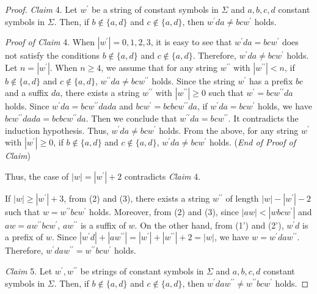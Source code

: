 \begin{proof}
  \smallskip

  \noindent
  \textit{Claim} 4.
  Let $w^{\prime}$ be a string of constant symbols in $\Sigma$ and $a,b,c,d$ constant symbols in $\Sigma$.
  Then, if $b \not\in \{a,d\}$ and $c \not\in \{a,d\}$, then $w^{\prime}da \not = bcw^{\prime}$ holds.

  \smallskip
  
  \noindent
  \textit{Proof of Claim} 4.
  When $|w^{\prime}| = 0, 1, 2, 3$, it is easy to see that $w^{\prime}da=bcw^{\prime}$ does not satisfy the conditions $b \not\in \{a,d\}$ and $c \not\in \{a,d\}$. Therefore, $w^{\prime}da \not= bcw^{\prime}$ holds.
  Let $n = |w^{\prime}|$.
  When $n \ge 4$, we assume that for any string $w^{\prime\prime}$ with $|w^{\prime\prime}|<n$, if $b \not\in \{a,d\}$ and $c \not\in \{a,d\}$, $w^{\prime\prime}da \not =bcw^{\prime\prime}$ holds.
  Since the string $w^{\prime}$ has a prefix $bc$ and a suffix $da$, there exists a string $w^{\prime\prime}$ with $|w^{\prime\prime}| \geq 0$ such that $w^{\prime}=bcw^{\prime\prime}da$ holds.
  Since $w^{\prime}da=bcw^{\prime\prime}dada$ and $bcw^{\prime}=bcbcw^{\prime\prime}da$, if $w^{\prime}da = bcw^{\prime}$ holds, we have $bcw^{\prime\prime}dada=bcbcw^{\prime\prime}da$.
  Then we conclude that $w^{\prime\prime}da=bcw^{\prime\prime}$.
  It contradicts the induction hypothesis. Thus, $w^{\prime}da \not= bcw^{\prime}$ holds.
  From the above, for any string $w^{\prime}$ with $|w^{\prime}| \geq 0$, if $b \not\in \{a,d\}$ and $c \not\in \{a,d\}$, $w^{\prime}da \not =bcw^{\prime}$ holds.
  (\textit{End of Proof of Claim})
  
  \smallskip

  \noindent
  Thus, the case of $|w|=|w^{\prime}|+2$ contradicts \textit{Claim} 4. 

  If $|w| \ge |w^{\prime}|+3$, from (2) and (3), there exists a string $w^{\prime\prime}$ of length $|w|-|w^{\prime}|-2$ such that $w=w^{\prime\prime}bcw^{\prime}$ holds.
  Moreover, from (2) and (3), since $|aw| < |wbcw^{\prime}|$ and $aw = aw^{\prime\prime}bcw^{\prime}$, $aw^{\prime\prime}$ is a suffix of $w$.
  On the other hand, from (1') and (2'), $w^{\prime}d$ is a prefix of $w$.
  Since $|w^{\prime}d| + |aw^{\prime\prime}| = |w^{\prime}| + |w^{\prime\prime}| + 2 = |w|$, we have $w=w^{\prime}daw^{\prime\prime}$.
  Therefore, $w^{\prime}daw^{\prime\prime} = w^{\prime\prime}bcw^{\prime}$ holds.
  
  \smallskip
  
  \noindent
  \textit{Claim} 5.
  Let $w^{\prime},w^{\prime\prime}$ be strings of constant symbols in $\Sigma$ and $a,b,c,d$ constant symbols in $\Sigma$.
  Then, if $b \not\in \{a,d\}$ and $c \not\in \{a,d\}$, then $w^{\prime}daw^{\prime\prime} \not = w^{\prime\prime}bcw^{\prime}$ holds.


\end{proof}
